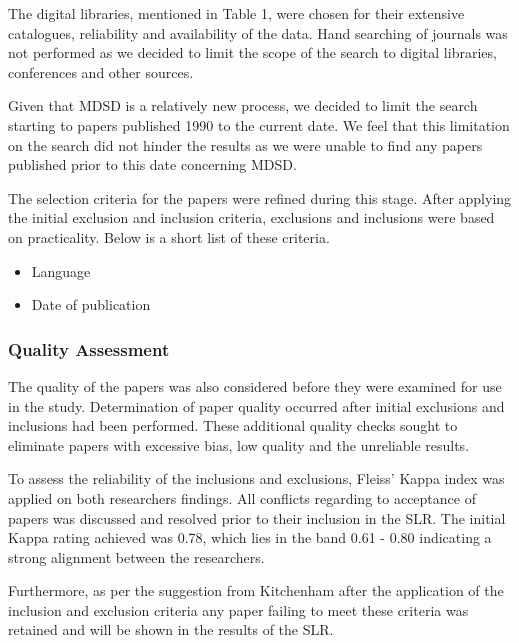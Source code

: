 \documentclass[10pt,twocolumn]{article}
\begin{document}
The digital libraries, mentioned in Table 1, were chosen for their extensive catalogues, reliability and availability of the data. Hand searching of journals was not performed as we decided to limit the scope of the search to digital libraries, conferences and other sources.

Given that MDSD is a relatively new process, we decided to limit the search starting to papers published 1990 to the current date. We feel that this limitation on the search did not hinder the results as we were unable to find any papers published prior to this date concerning MDSD.

The selection criteria for the papers were refined during this stage. After applying the initial exclusion and inclusion criteria, exclusions and inclusions were based on practicality. Below is a short list of these criteria.

\begin{itemize}
\item Language
\item Date of publication
\end{itemize}

\subsubsection{Quality Assessment}

The quality of the papers was also considered before they were examined for use in the study. Determination of paper quality occurred after initial exclusions and inclusions had been performed. These additional quality checks sought to eliminate papers with excessive bias, low quality and the unreliable results.


To assess the reliability of the inclusions and exclusions, Fleiss' Kappa index was applied on both researchers findings. All conflicts regarding to acceptance of papers was discussed and resolved prior to their inclusion in the SLR. The initial Kappa rating achieved was 0.78, which lies in the band 0.61 - 0.80 indicating a strong alignment between the researchers. 

Furthermore, as per the suggestion from Kitchenham \cite{kitchenham2007guidelines} after the application of the inclusion and exclusion criteria any paper failing to meet these criteria was retained and will be shown in the results of the SLR.

\end{document}
